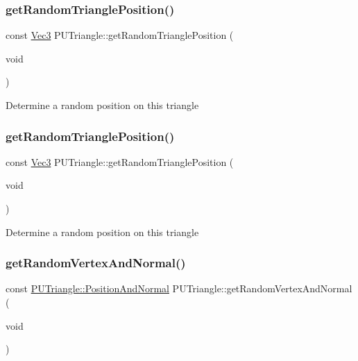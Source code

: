 \subsubsection{\texorpdfstring{get\+Random\+Triangle\+Position()}{getRandomTrianglePosition()}\hspace{0.1cm}{\footnotesize\ttfamily [1/2]}}
{\footnotesize\ttfamily const \hyperlink{classVec3}{Vec3} P\+U\+Triangle\+::get\+Random\+Triangle\+Position (\begin{DoxyParamCaption}\item[{void}]{ }\end{DoxyParamCaption})}

Determine a random position on this triangle \mbox{\label{classPUTriangle_a76d5ffffbe96de214ca5dd8b61d28055}} 
\subsubsection{\texorpdfstring{get\+Random\+Triangle\+Position()}{getRandomTrianglePosition()}\hspace{0.1cm}{\footnotesize\ttfamily [2/2]}}
{\footnotesize\ttfamily const \hyperlink{classVec3}{Vec3} P\+U\+Triangle\+::get\+Random\+Triangle\+Position (\begin{DoxyParamCaption}\item[{void}]{ }\end{DoxyParamCaption})}

Determine a random position on this triangle \mbox{\label{classPUTriangle_a8a60cfc73a7b01ae00aa6380d8d3332f}} 
\subsubsection{\texorpdfstring{get\+Random\+Vertex\+And\+Normal()}{getRandomVertexAndNormal()}\hspace{0.1cm}{\footnotesize\ttfamily [1/2]}}
{\footnotesize\ttfamily const \hyperlink{structPUTriangle_1_1PositionAndNormal}{P\+U\+Triangle\+::\+Position\+And\+Normal} P\+U\+Triangle\+::get\+Random\+Vertex\+And\+Normal (\begin{DoxyParamCaption}\item[{void}]{ }\end{DoxyParamCaption})}


